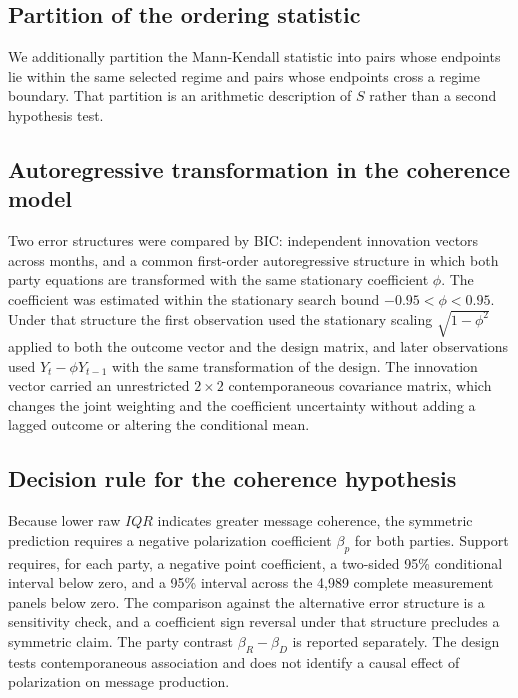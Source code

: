 \subsection*{Partition of the ordering statistic}

We additionally partition the Mann-Kendall statistic into pairs whose endpoints lie within the same selected regime and pairs whose endpoints cross a regime boundary. That partition is an arithmetic description of $S$ rather than a second hypothesis test.

\subsection*{Autoregressive transformation in the coherence model}

Two error structures were compared by BIC: independent innovation vectors across months, and a common first-order autoregressive structure in which both party equations are transformed with the same stationary coefficient $\phi$. The coefficient was estimated within the stationary search bound $-0.95 < \phi < 0.95$. Under that structure the first observation used the stationary scaling $\sqrt{1-\phi^{2}}$ applied to both the outcome vector and the design matrix, and later observations used $Y_t-\phi Y_{t-1}$ with the same transformation of the design. The innovation vector carried an unrestricted $2\times2$ contemporaneous covariance matrix, which changes the joint weighting and the coefficient uncertainty without adding a lagged outcome or altering the conditional mean.

\subsection*{Decision rule for the coherence hypothesis}

Because lower raw $IQR$ indicates greater message coherence, the symmetric prediction requires a negative polarization coefficient $\beta_p$ for both parties. Support requires, for each party, a negative point coefficient, a two-sided 95\% conditional interval below zero, and a 95\% interval across the 4,989 complete measurement panels below zero. The comparison against the alternative error structure is a sensitivity check, and a coefficient sign reversal under that structure precludes a symmetric claim. The party contrast $\beta_R-\beta_D$ is reported separately. The design tests contemporaneous association and does not identify a causal effect of polarization on message production.

